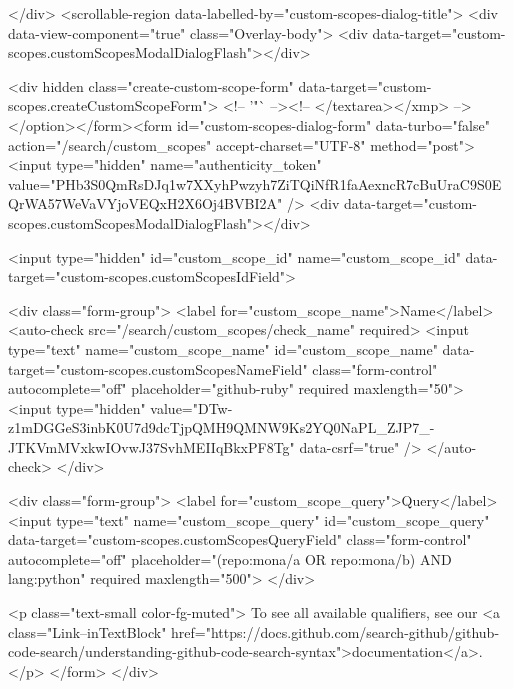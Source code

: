 </div>
      <scrollable-region data-labelled-by="custom-scopes-dialog-title">
        <div data-view-component="true" class="Overlay-body">        <div data-target="custom-scopes.customScopesModalDialogFlash"></div>

        <div hidden class="create-custom-scope-form" data-target="custom-scopes.createCustomScopeForm">
        <!-- '"` --><!-- </textarea></xmp> --></option></form><form id="custom-scopes-dialog-form" data-turbo="false" action="/search/custom_scopes" accept-charset="UTF-8" method="post"><input type="hidden" name="authenticity_token" value="PHb3S0QmRsDJq1w7XXyhPwzyh7ZiTQiNfR1faAexncR7cBuUraC9S0EQrWA57WeVaVYjoVEQxH2X6Oj4BVBI2A" />
          <div data-target="custom-scopes.customScopesModalDialogFlash"></div>

          <input type="hidden" id="custom_scope_id" name="custom_scope_id" data-target="custom-scopes.customScopesIdField">

          <div class="form-group">
            <label for="custom_scope_name">Name</label>
            <auto-check src="/search/custom_scopes/check_name" required>
              <input
                type="text"
                name="custom_scope_name"
                id="custom_scope_name"
                data-target="custom-scopes.customScopesNameField"
                class="form-control"
                autocomplete="off"
                placeholder="github-ruby"
                required
                maxlength="50">
              <input type="hidden" value="DTw-z1mDGGeS3inbK0U7d9dcTjpQMH9QMNW9Ks2YQ0NaPL_ZJP7_-JTKVmMVxkwIOvwJ37SvhMEIIqBkxPF8Tg" data-csrf="true" />
            </auto-check>
          </div>

          <div class="form-group">
            <label for="custom_scope_query">Query</label>
            <input
              type="text"
              name="custom_scope_query"
              id="custom_scope_query"
              data-target="custom-scopes.customScopesQueryField"
              class="form-control"
              autocomplete="off"
              placeholder="(repo:mona/a OR repo:mona/b) AND lang:python"
              required
              maxlength="500">
          </div>

          <p class="text-small color-fg-muted">
            To see all available qualifiers, see our <a class="Link--inTextBlock" href="https://docs.github.com/search-github/github-code-search/understanding-github-code-search-syntax">documentation</a>.
          </p>
</form>        </div>

